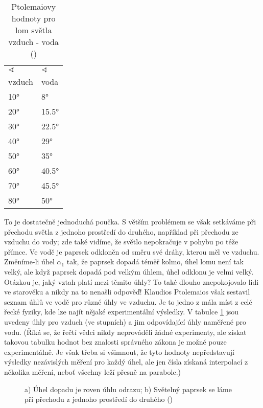     \begin{table}[ht!]      %
      \centering
      \renewcommand{\arraystretch}{1.0}
      \begin{tabular}{>{\centering\arraybackslash}p{3em}|>{\centering\arraybackslash}p{3em}}
         \hline \(\sphericalangle\) & \(\sphericalangle\)     \\
                    vzduch & voda         \\
         \hline   \ang{10} & \ang{8}      \\
                  \ang{20} & \ang{15.5}   \\
                  \ang{30} & \ang{22.5}   \\
                  \ang{40} & \ang{29}     \\
                  \ang{50} & \ang{35}     \\
                  \ang{60} & \ang{40.5}   \\
                  \ang{70} & \ang{45.5}   \\
                  \ang{80} & \ang{50}     \\
         \hline 
      \end{tabular}
      \caption{Ptolemaiovy hodnoty pro lom světla vzduch - voda 
               (\cite[s.~347]{Feynman01})}
      \label{fyz:tab007}
    \end{table}
    To je dostatečně jednoduchá poučka. S větším problémem se však setkáváme při přechodu světla z 
    jednoho prostředí do druhého, například při přechodu ze vzduchu do vody; zde také vidíme, že 
    světlo nepokračuje v pohybu po téže přímce. Ve vodě je paprsek odkloněn od směru své dráhy, 
    kterou měl ve vzduchu. Změníme-li úhel \(\alpha_1\) tak, že paprsek dopadá téměř kolmo, úhel 
    lomu není tak velký, ale když paprsek dopadá pod velkým úhlem, úhel odklonu je velmi velký. 
    Otázkou je, jaký vztah platí mezi těmito úhly? To také dlouho znepokojovalo lidi ve starověku a 
    nikdy na to nenašli odpověď! Klaudios Ptolemaios však sestavil seznam úhlů ve vodě pro různé 
    úhly ve vzduchu. Je to jedno z mála míst z celé řecké fyziky, kde lze najít nějaké 
    experimentální výsledky. V tabulce \ref{fyz:tab007} jsou uvedeny úhly pro vzduch (ve stupních) 
    a jim odpovídající úhly naměřené pro vodu. (Říká se, že řečtí vědci nikdy neprováděli žádné 
    experimenty, ale získat takovou tabulku hodnot bez znalosti správného zákona je možné pouze 
    experimentálně. Je však třeba si všimnout, že tyto hodnoty nepředstavují výsledky nezávislých 
    měření pro každý úhel, ale jen čísla získaná interpolací z několika měření, neboť všechny leží 
    přesně na parabole.)
    \begin{figure}[ht!] 
      \centering
      \caption{a) Úhel dopadu je roven úhlu odrazu; b) Světelný paprsek se láme při přechodu z
              jednoho prostředí do druhého (\cite[s.~346]{Feynman01})}
    \end{figure}
   
